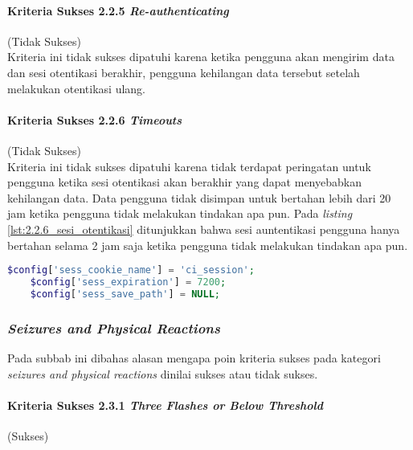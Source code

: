 \paragraph{Kriteria Sukses 2.2.5 \textit{Re-authenticating}}
\label{par:kepatuhan_bluetape_kriteria_sukses_2.2.5}
(Tidak Sukses)\\

Kriteria ini tidak sukses dipatuhi karena ketika pengguna akan mengirim data dan sesi otentikasi berakhir, pengguna kehilangan data tersebut setelah melakukan otentikasi ulang.

\paragraph{Kriteria Sukses 2.2.6 \textit{Timeouts}}
\label{par:kepatuhan_bluetape_kriteria_sukses_2.2.6}
(Tidak Sukses)\\

Kriteria ini tidak sukses dipatuhi karena tidak terdapat peringatan untuk pengguna ketika sesi otentikasi akan berakhir yang dapat menyebabkan kehilangan data. Data pengguna tidak disimpan untuk bertahan lebih dari 20 jam ketika pengguna tidak melakukan tindakan apa pun. Pada \textit{listing} \ref{lst:2.2.6_sesi_otentikasi} ditunjukkan bahwa sesi auntentikasi pengguna hanya bertahan selama 2 jam saja ketika pengguna tidak melakukan tindakan apa pun.

\begin{lstlisting}[frame=single, label={lst:2.2.6_sesi_otentikasi}, language=PHP, caption=Pelanggaran Kriteria Sukses 2.2.6 pada Bagian Sesi Otentikasi]
    $config['sess_cookie_name'] = 'ci_session';
    $config['sess_expiration'] = 7200;
    $config['sess_save_path'] = NULL;
\end{lstlisting}

\subsubsection{\textit{Seizures and Physical Reactions}}
\label{subsubsec:kepatuhan_bluetape_seizures_and_physical_reactions}
Pada subbab ini dibahas alasan mengapa poin kriteria sukses pada kategori \textit{seizures and physical reactions} dinilai sukses atau tidak sukses.

\paragraph{Kriteria Sukses 2.3.1 \textit{Three Flashes or Below Threshold}}
\label{par:kepatuhan_bluetape_kriteria_sukses_2.3.1}
(Sukses)\\

